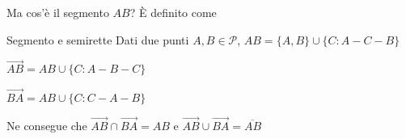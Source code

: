 Ma cos'è il segmento \(AB\)? È definito come 
\begin{definition}{Segmento e semirette}
    Dati due punti \(A, B \in \mathcal{P}\), 
    \(AB = \{A, B\} \cup \{C : A - C - B\} \)  

    \(\vec{AB} = AB \cup \{C : A - B - C\} \) 

    \(\vec{BA} = AB \cup \{C : C - A - B\} \) 
\end{definition}

Ne consegue che \(\vec{AB} \cap \vec{BA} = AB\) e \(\vec{AB} \cup \vec{BA} =
\overline{AB}\) 







